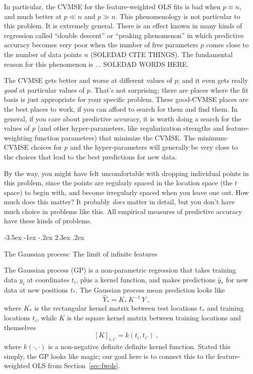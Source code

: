 \documentclass[12pt,letterpaper]{article}
\makeatletter
\renewcommand\section{\@startsection {section}{1}{\z@}%
  {-3.5ex \@plus -1ex \@minus -.2ex}%
  {2.3ex \@plus.2ex}%
  {\raggedright\normalfont\Large\bfseries}}
\newcommand{\sectionname}{Section}
\makeatother
\begin{document}
In particular, the CVMSE for the feature-weighted OLS fits is bad when $p\approx n$, and much better at $p\ll n$ and $p \gg n$.
This phenomenology is not particular to this problem.
It is extremely general.
There is an effect known in many kinds of regression called ``double descent'' or ``peaking phenomenon'' in which predictive accuracy becomes very poor when the number of free parameters $p$ comes close to the number of data points $n$ (SOLEDAD CITE THINGS).
The fundamental reason for this phenomenon is ... SOLEDAD WORDS HERE.

The CVMSE gets better and worse at different values of $p$;
and it even gets really \emph{good} at particular values of $p$.
That's not surprising; there are places where the fit basis is just appropriate for your specific problem.
These good-CVMSE places are the best places to work, if you can afford to search for them and find them.
In general, if you care about predictive accuracy, it is worth doing a search for the values of $p$ (and other hyper-parameters, like regularization strengths and feature-weighting function parameters) that minimize the CVMSE.
The minimum-CVMSE choices for $p$ and the hyper-parameters will generally be very close to the choices that lead to the best predictions for new data.

By the way, you might have felt uncomfortable with dropping individual points in this problem, since the points are regularly spaced in the location space (the $t$ space) to begin with, and become irregularly spaced when you leave one out.
How much does this matter?
It probably \emph{does} matter in detail, but you don't have much choice in problems like this.
All empirical measures of predictive accuracy have these kinds of problems.

\section{The Gaussian process: The limit of infinite features}\label{sec:gp}

The Gaussian process (GP) is a non-parametric regression that takes training data $y_i$ at coordinates $t_i$, plus a kernel function, and makes predictions $\hat{y}_\ast$ for new data at new positions $t_\ast$.
The Gaussian process mean prediction looks like%
\begin{equation}\label{eq:gpmean}
    \hat{Y}_\ast = K_\ast\,K^{-1}\,Y
    ~,
\end{equation}
where $K_\ast$ is the rectangular kernel matrix between test locations $t_\ast$ and training locations $t_i$, while $K$ is the square kernel matrix between training locations and themselves
\begin{equation}\label{eq:Kmatrix}
    [K]_{i,i'} = k(t_i,t_{i'})
    ~,
\end{equation}
where $k(\cdot,\cdot)$ is a non-negative definite definite kernel function.
Stated this simply, the GP looks like magic; our goal here is to connect this to the feature-weighted OLS from \sectionname~\ref{sec:fwols}.
\end{document}
